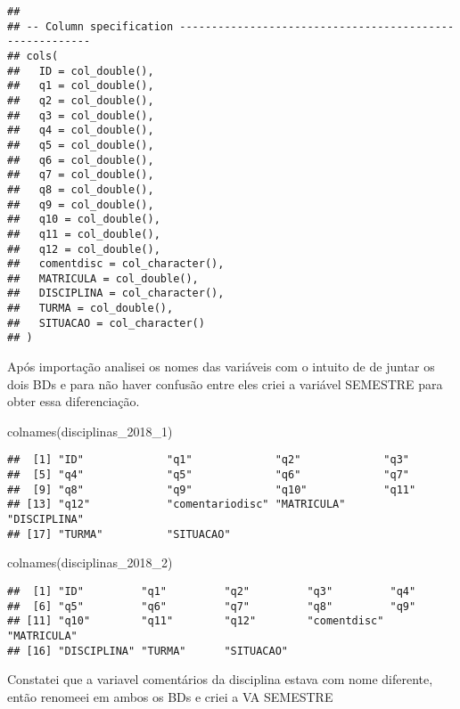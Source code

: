 \documentclass[
]{article}
\newenvironment{Shaded}{\begin{snugshade}}{\end{snugshade}}
\newcommand{\FunctionTok}[1]{\textcolor[rgb]{0.00,0.00,0.00}{#1}}
\newcommand{\NormalTok}[1]{#1}
\begin{document}
\begin{verbatim}
## 
## -- Column specification --------------------------------------------------------
## cols(
##   ID = col_double(),
##   q1 = col_double(),
##   q2 = col_double(),
##   q3 = col_double(),
##   q4 = col_double(),
##   q5 = col_double(),
##   q6 = col_double(),
##   q7 = col_double(),
##   q8 = col_double(),
##   q9 = col_double(),
##   q10 = col_double(),
##   q11 = col_double(),
##   q12 = col_double(),
##   comentdisc = col_character(),
##   MATRICULA = col_double(),
##   DISCIPLINA = col_character(),
##   TURMA = col_double(),
##   SITUACAO = col_character()
## )
\end{verbatim}

Após importação analisei os nomes das variáveis com o intuito de de
juntar os dois BDs e para não haver confusão entre eles criei a variável
SEMESTRE para obter essa diferenciação.

\begin{Shaded}
\begin{Highlighting}[]
\FunctionTok{colnames}\NormalTok{(disciplinas\_2018\_1)}
\end{Highlighting}
\end{Shaded}

\begin{verbatim}
##  [1] "ID"             "q1"             "q2"             "q3"            
##  [5] "q4"             "q5"             "q6"             "q7"            
##  [9] "q8"             "q9"             "q10"            "q11"           
## [13] "q12"            "comentariodisc" "MATRICULA"      "DISCIPLINA"    
## [17] "TURMA"          "SITUACAO"
\end{verbatim}

\begin{Shaded}
\begin{Highlighting}[]
\FunctionTok{colnames}\NormalTok{(disciplinas\_2018\_2)}
\end{Highlighting}
\end{Shaded}

\begin{verbatim}
##  [1] "ID"         "q1"         "q2"         "q3"         "q4"        
##  [6] "q5"         "q6"         "q7"         "q8"         "q9"        
## [11] "q10"        "q11"        "q12"        "comentdisc" "MATRICULA" 
## [16] "DISCIPLINA" "TURMA"      "SITUACAO"
\end{verbatim}

Constatei que a variavel comentários da disciplina estava com nome
diferente, então renomeei em ambos os BDs e criei a VA SEMESTRE
\end{document}
